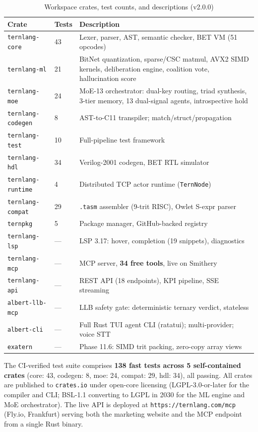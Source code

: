 \documentclass[11pt,a4paper]{article}
\begin{document}
\begin{table}[htbp]
\centering
\small
\caption{Workspace crates, test counts, and descriptions (v2.0.0)}
\label{tab:status}
\footnotesize
\begin{tabular}{@{}p{2.9cm}l p{5.8cm}@{}}
\toprule
Crate & Tests & Description \\
\midrule
\texttt{ternlang-core}    & 43  & Lexer, parser, AST, semantic checker, BET VM (51 opcodes) \\
\texttt{ternlang-ml}      & 21  & BitNet quantization, sparse/CSC matmul, AVX2 SIMD kernels, deliberation engine, coalition vote, hallucination score \\
\texttt{ternlang-moe}     & 24  & MoE-13 orchestrator: dual-key routing, triad synthesis, 3-tier memory, 13 dual-signal agents, introspective hold \\
\texttt{ternlang-codegen} & 8   & AST-to-C11 transpiler; match/struct/propagation \\
\texttt{ternlang-test}    & 10  & Full-pipeline test framework \\
\texttt{ternlang-hdl}     & 34  & Verilog-2001 codegen, BET RTL simulator \\
\texttt{ternlang-runtime} & 4   & Distributed TCP actor runtime (\texttt{TernNode}) \\
\texttt{ternlang-compat}  & 29  & \texttt{.tasm} assembler (9-trit RISC), Owlet S-expr parser \\
\texttt{ternpkg}          & 5   & Package manager, GitHub-backed registry \\
\texttt{ternlang-lsp}     & --- & LSP 3.17: hover, completion (19 snippets), diagnostics \\
\texttt{ternlang-mcp}     & --- & MCP server, \textbf{34 free tools}, live on Smithery \\
\texttt{ternlang-api}     & --- & REST API (18 endpoints), KPI pipeline, SSE streaming \\
\texttt{albert-llb-mcp}   & --- & LLB safety gate: deterministic ternary verdict, stateless \\
\texttt{albert-cli}       & --- & Full Rust TUI agent CLI (ratatui); multi-provider; voice STT \\
\texttt{exatern}          & --- & Phase 11.6: SIMD trit packing, zero-copy array views \\
\bottomrule
\end{tabular}
\end{table}

The CI-verified test suite comprises \textbf{138 fast tests across 5 self-contained crates}
(core: 43, codegen: 8, moe: 24, compat: 29, hdl: 34), all passing. All crates are
published to \texttt{crates.io} under open-core licensing (LGPL-3.0-or-later for the
compiler and CLI; BSL-1.1 converting to LGPL in 2030 for the ML engine and MoE
orchestrator). The live API is deployed at \texttt{https://ternlang.com/mcp}
(Fly.io, Frankfurt) serving both the marketing website and the MCP endpoint from a single
Rust binary.
\end{document}
